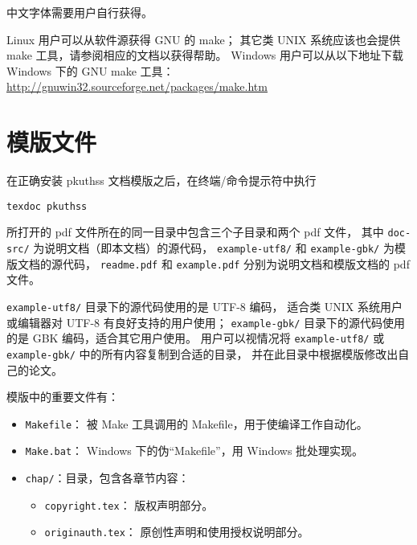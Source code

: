 	中文字体需要用户自行获得。

	Linux 用户可以从软件源获得 GNU 的 make；
	其它类 UNIX 系统应该也会提供 make 工具，请参阅相应的文档以获得帮助。%
	Windows 用户可以从以下地址下载 Windows 下的 GNU make 工具：\\
	\hspace*{\parindent}%
	\url{http://gnuwin32.sourceforge.net/packages/make.htm}

	\section{模版文件}\label{sec:doc-dir}

	在正确安装 pkuthss 文档模版之后，在终端/命令提示符中执行
\begin{Verbatim}[frame = single]
texdoc pkuthss
\end{Verbatim}
	所打开的 pdf 文件所在的同一目录中包含三个子目录和两个 pdf 文件，
	其中 \verb|doc-src/| 为说明文档（即本文档）的源代码，
	\verb|example-utf8/| 和 \verb|example-gbk/| 为模版文档的源代码，
	\verb|readme.pdf| 和 \verb|example.pdf|
	分别为说明文档和模版文档的 pdf 文件。

	\verb|example-utf8/| 目录下的源代码使用的是 UTF-8 编码，
	适合类 UNIX 系统用户或编辑器对 UTF-8 有良好支持的用户使用；%
	\verb|example-gbk/| 目录下的源代码使用的是 GBK 编码，适合其它用户使用。%
	用户可以视情况将 \verb|example-utf8/| 或 \verb|example-gbk/|
	中的所有内容复制到合适的目录，
	并在此目录中根据模版修改出自己的论文。


	模版中的重要文件有：
	\begin{itemize}
		\item \verb|Makefile|：
			被 Make 工具调用的 Makefile，用于使编译工作自动化。
		\item \verb|Make.bat|：%
			Windows 下的伪“Makefile”，用 Windows 批处理实现。

		\item \verb|chap/|：目录，包含各章节内容：
		\begin{itemize}
			\item \verb|copyright.tex|：
				版权声明部分。
			\item \verb|originauth.tex|：
				原创性声明和使用授权说明部分\supercite{pku-originauth}。
		\end{itemize}
	\end{itemize}

